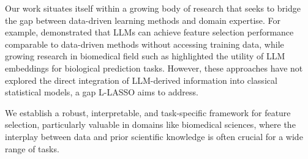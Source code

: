 





Our work situates itself within a growing body of research that seeks to bridge the gap between data-driven learning methods and domain expertise. For example, \cite{jeong2024llmselectfeatureselectionlarge} demonstrated that LLMs can achieve feature selection performance comparable to data-driven methods without accessing training data, while growing research in biomedical field such as \cite{chen2024embeddings, theodoris2023transfer, cui2024scgpt} highlighted the utility of LLM embeddings for biological prediction tasks. However, these approaches have not explored the direct integration of LLM-derived information into classical statistical models, a gap L-LASSO aims to address.

We establish a robust, interpretable, and task-specific framework for feature selection, particularly valuable in domains like biomedical sciences, where the interplay between data and prior scientific knowledge is often crucial for a wide range of tasks. 